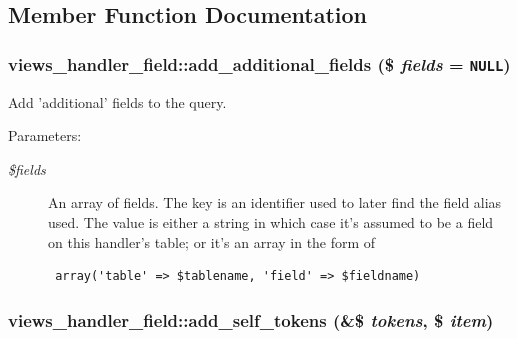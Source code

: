 \subsection{Member Function Documentation}
\hypertarget{classviews__handler__field_1590869371ef24a211e591a07ed5f7cb}{
\subsubsection[{add\_\-additional\_\-fields}]{\setlength{\rightskip}{0pt plus 5cm}views\_\-handler\_\-field::add\_\-additional\_\-fields (\$ {\em fields} = {\tt NULL})}}
\label{classviews__handler__field_1590869371ef24a211e591a07ed5f7cb}


Add 'additional' fields to the query.

\begin{Desc}
\item[Parameters:]
\begin{description}
\item[{\em \$fields}]An array of fields. The key is an identifier used to later find the field alias used. The value is either a string in which case it's assumed to be a field on this handler's table; or it's an array in the form of 

\begin{Code}\begin{verbatim} array('table' => $tablename, 'field' => $fieldname) 
\end{verbatim}
\end{Code}

 \end{description}
\end{Desc}
\hypertarget{classviews__handler__field_c61cc83a4c8c579993a254b5b1e16cbc}{
\subsubsection[{add\_\-self\_\-tokens}]{\setlength{\rightskip}{0pt plus 5cm}views\_\-handler\_\-field::add\_\-self\_\-tokens (\&\$ {\em tokens}, \/  \$ {\em item})}}
\label{classviews__handler__field_c61cc83a4c8c579993a254b5b1e16cbc}


